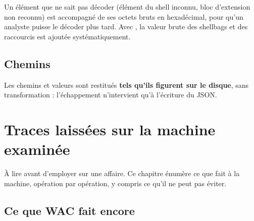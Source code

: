 \documentclass[11pt,a4paper,oneside]{report}
\begin{document}
Un élément que \wac{} ne sait pas décoder (élément du shell inconnu, bloc
d'extension non reconnu) est accompagné de ses octets bruts en hexadécimal, pour
qu'un analyste puisse le décoder plus tard. Avec , la valeur brute des
shellbags et des raccourcis est ajoutée systématiquement.

\section{Chemins}

Les chemins et valeurs sont restitués \textbf{tels qu'ils figurent sur le
disque}, sans transformation : l'échappement n'intervient qu'à l'écriture du
JSON.

\chapter{Traces laissées sur la machine examinée}\label{chap:traces}

À lire avant d'employer \wac{} sur une affaire. Ce chapitre énumère ce que \wac{}
fait à la machine, opération par opération, y compris ce qu'il ne peut pas
éviter.

\section{Ce que WAC fait encore}
\end{document}

